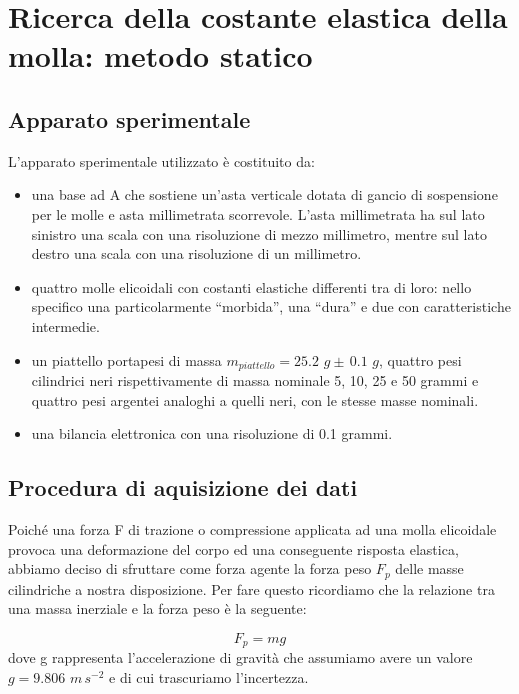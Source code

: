 
\section{Ricerca della costante elastica della molla: metodo statico}

\subsection{Apparato sperimentale}
L'apparato sperimentale utilizzato è costituito da:
	\begin{itemize}
		\item{una base ad A che sostiene un'asta verticale dotata di gancio di sospensione
            per le molle e asta millimetrata scorrevole. L'asta millimetrata ha sul lato sinistro
            una scala con una risoluzione di mezzo millimetro, mentre sul lato destro una scala con
            una risoluzione di un millimetro.}
		\item{quattro molle elicoidali con costanti elastiche differenti tra di loro: nello specifico
            una particolarmente ``morbida'', una ``dura'' e due con caratteristiche intermedie.}
		\item{un piattello portapesi di massa $m_{piattello} = 25.2\,\,g \pm\, 0.1\,\,g$, quattro pesi
            cilindrici neri rispettivamente di massa nominale 5, 10, 25 e 50 grammi e quattro pesi argentei
            analoghi a quelli neri, con le stesse masse nominali.}
        \item{una bilancia elettronica con una risoluzione di 0.1 grammi.}
	\end{itemize}

\subsection{Procedura di aquisizione dei dati}

Poiché una forza F di trazione o compressione applicata ad una molla elicoidale provoca una deformazione del corpo ed una conseguente risposta elastica, abbiamo deciso di sfruttare come forza agente la forza peso $F_{p}$ delle masse cilindriche a nostra disposizione. Per fare questo ricordiamo che la relazione tra una massa inerziale e la forza peso è la seguente:

\begin{equation}
	F_{p} = mg
    \label{eq:fp}
\end{equation}
%
dove g rappresenta l'accelerazione di gravità che assumiamo avere un valore $g = 9.806\,\,m\,s^{-2}$ e di cui trascuriamo l'incertezza.

